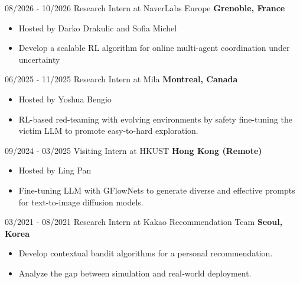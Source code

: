 \documentclass[10pt]{developercv} %
\begin{document}
\begin{entrylist}
    \entry
        {08/2026 - 10/2026}
		{Research Intern at NaverLabs Europe} 
		{\textbf{Grenoble, France}}
        {\vspace{-5pt}
        \begin{itemize}[noitemsep,topsep=0pt,parsep=2pt,partopsep=0pt, leftmargin=0pt]
            \item[] Hosted by Darko Drakulic and Sofia Michel
            \item[] Develop a scalable RL algorithm for online multi-agent coordination under uncertainty
        \end{itemize}
        }
    \entry
        {06/2025 - 11/2025}
		{Research Intern at Mila} 
		{\textbf{Montreal, Canada}}
        {\vspace{-5pt}
        \begin{itemize}[noitemsep,topsep=0pt,parsep=2pt,partopsep=0pt, leftmargin=0pt]
            \item[] Hosted by Yoshua Bengio
            \item[] RL-based red-teaming with evolving environments by safety fine-tuning the victim LLM to promote easy-to-hard exploration.
        \end{itemize}
        }
	\entry
        {09/2024 - 03/2025}
		{Visiting Intern at HKUST} 
		{\textbf{Hong Kong (Remote)}}
        {\vspace{-5pt}
        \begin{itemize}[noitemsep,topsep=0pt,parsep=2pt,partopsep=0pt, leftmargin=0pt]
            \item[] Hosted by Ling Pan
            \item[] Fine-tuning LLM with GFlowNets to generate diverse and effective prompts for text-to-image diffusion models.
        \end{itemize}
        }
    \entry
        {03/2021 - 08/2021}
		{Research Intern at Kakao Recommendation Team} 
		{\textbf{Seoul, Korea}}
        {\vspace{-5pt}
        \begin{itemize}[noitemsep,topsep=0pt,parsep=2pt,partopsep=0pt, leftmargin=0pt]
            \item[] Develop contextual bandit algorithms for a personal recommendation.
            \item[] Analyze the gap between simulation and real‑world deployment.
        \end{itemize}
        }
 \end{entrylist}
\end{document}

